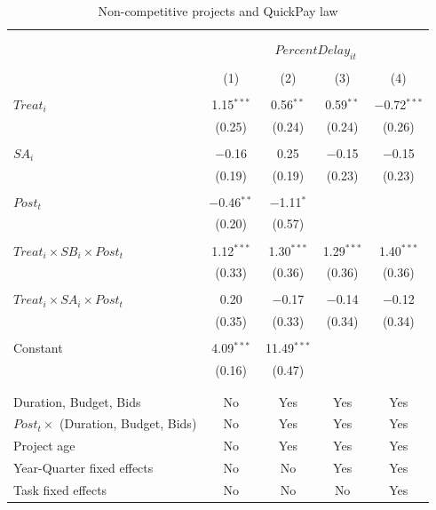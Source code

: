 \documentclass[
]{article}
\begin{document}
\begin{table}[H] \centering 
  \caption{Non-competitive projects and QuickPay law} 
  \label{} 
\small 
\begin{tabular}{@{\extracolsep{-2pt}}lcccc} 
\\[-1.8ex]\hline 
\hline \\[-1.8ex] 
\\[-1.8ex] & \multicolumn{4}{c}{$PercentDelay_{it}$  } \\ 
\\[-1.8ex] & (1) & (2) & (3) & (4)\\ 
\hline \\[-1.8ex] 
 $Treat_i$ & 1.15$^{***}$ & 0.56$^{**}$ & 0.59$^{**}$ & $-$0.72$^{***}$ \\ 
  & (0.25) & (0.24) & (0.24) & (0.26) \\ 
  & & & & \\ 
 $SA_i$ & $-$0.16 & 0.25 & $-$0.15 & $-$0.15 \\ 
  & (0.19) & (0.19) & (0.23) & (0.23) \\ 
  & & & & \\ 
 $Post_t$ & $-$0.46$^{**}$ & $-$1.11$^{*}$ &  &  \\ 
  & (0.20) & (0.57) &  &  \\ 
  & & & & \\ 
 $Treat_i \times SB_i \times Post_t$ & 1.12$^{***}$ & 1.30$^{***}$ & 1.29$^{***}$ & 1.40$^{***}$ \\ 
  & (0.33) & (0.36) & (0.36) & (0.36) \\ 
  & & & & \\ 
 $Treat_i \times SA_i \times Post_t$ & 0.20 & $-$0.17 & $-$0.14 & $-$0.12 \\ 
  & (0.35) & (0.33) & (0.34) & (0.34) \\ 
  & & & & \\ 
 Constant & 4.09$^{***}$ & 11.49$^{***}$ &  &  \\ 
  & (0.16) & (0.47) &  &  \\ 
  & & & & \\ 
\hline \\[-1.8ex] 
Duration, Budget, Bids & No & Yes & Yes & Yes \\ 
$Post_t \times $  (Duration, Budget, Bids) & No & Yes & Yes & Yes \\ 
Project age & No & Yes & Yes & Yes \\ 
Year-Quarter fixed effects & No & No & Yes & Yes \\ 
Task fixed effects & No & No & No & Yes \\ 

\end{tabular}
\end{table}
\end{document}
